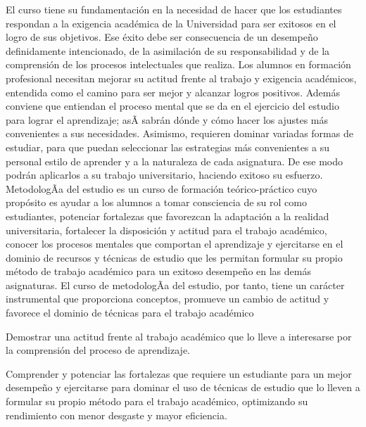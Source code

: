 \begin{syllabus}


\begin{justification}
El curso tiene su fundamentación en la necesidad de hacer que los estudiantes respondan a la exigencia académica de la Universidad para ser exitosos en el logro de sus objetivos. Ese  éxito debe ser consecuencia de un desempeño definidamente intencionado, de la asimilación de su responsabilidad y de la comprensión de los procesos intelectuales que realiza. 
Los alumnos en formación profesional necesitan mejorar su actitud frente al trabajo y exigencia académicos, entendida como el camino para ser mejor y alcanzar logros positivos. Además conviene que entiendan el proceso mental que se da en el ejercicio del estudio para lograr el aprendizaje; asÃ­  sabrán dónde y cómo hacer los ajustes más convenientes a sus necesidades. Asimismo, requieren dominar variadas formas de estudiar, para que puedan seleccionar las estrategias  más convenientes a su personal estilo de aprender y a la naturaleza de cada asignatura. De ese modo podrán  aplicarlos a su trabajo universitario, haciendo exitoso su esfuerzo.
MetodologÃ­a del estudio es un curso de formación teórico-práctico cuyo propósito es  ayudar a los alumnos a  tomar consciencia de su rol como estudiantes, potenciar fortalezas que favorezcan la adaptación a la realidad universitaria, fortalecer la disposición y actitud para el trabajo académico, conocer los procesos mentales que comportan el aprendizaje  y ejercitarse en el dominio de recursos y técnicas de estudio que les permitan formular su propio método de trabajo académico para un exitoso desempeño en las demás asignaturas. El curso de metodologÃ­a del estudio, por tanto, tiene un carácter instrumental que proporciona conceptos, promueve un cambio de actitud y favorece el dominio de técnicas para el  trabajo académico

\end{justification}

\begin{goals}
\item Demostrar una actitud frente al trabajo académico que lo lleve a interesarse por la comprensión del proceso de aprendizaje.
\item Comprender y potenciar las fortalezas que requiere un estudiante para  un mejor desempeño  y ejercitarse para dominar el uso de  técnicas de estudio que lo lleven a formular su propio método para el trabajo académico, optimizando su rendimiento con menor desgaste y mayor eficiencia.
\end{goals}


\end{syllabus}
